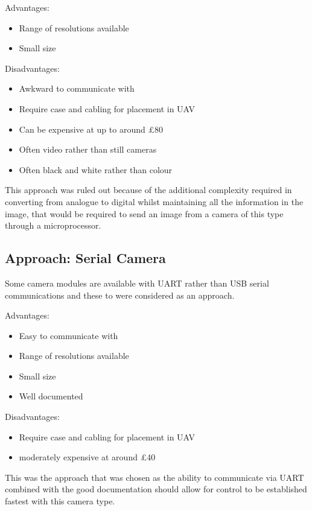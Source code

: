 Advantages:
      \begin{itemize}
         \item Range of resolutions available
		 \item Small size
     \end{itemize}

Disadvantages:
     \begin{itemize}
        \item Awkward to communicate with
        \item Require case and cabling for placement in UAV
		\item Can be expensive at up to around \pounds 80
		\item Often video rather than still cameras
		\item Often black and white rather than colour
     \end{itemize}

This approach was ruled out because of the additional complexity required in converting from analogue to digital whilst maintaining all the information in the image, that would be required to send an image from a camera of this type through a microprocessor.

\subsection{Approach: Serial Camera}
\label{sec:Serial_option}
Some camera modules are available with UART rather than USB serial communications and these to were considered as an approach.

Advantages:
      \begin{itemize}
		 \item Easy to communicate with
         \item Range of resolutions available
		 \item Small size
		 \item Well documented
     \end{itemize}

Disadvantages:
     \begin{itemize}
        \item Require case and cabling for placement in UAV
		\item moderately expensive at around \pounds 40
     \end{itemize}

This was the approach that was chosen as the ability to communicate via UART combined with the good documentation should allow for control to be established fastest with this camera type.